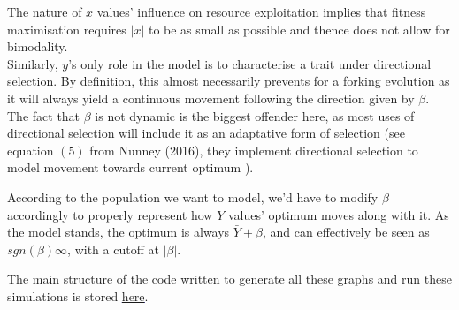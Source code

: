 \documentclass{article}
\begin{document}
The nature of $x$ values' influence on resource exploitation implies that fitness maximisation requires $\lvert x \rvert$ to be as small as possible and thence does not allow for bimodality. \\
\vspace{2mm}
Similarly, $y$'s only role in the model is to characterise a trait under directional selection. By definition, this almost necessarily prevents for a forking evolution as it will always yield a continuous movement following the direction given by $\beta$. \\
The fact that $\beta$ is not dynamic is the biggest offender here, as most uses of directional selection will include it as an adaptative form of selection (see equation $(5)$ from Nunney (2016), they implement directional selection to model movement towards current optimum \cite{Nun16}). \\
\vspace{5mm}

According to the population we want to model, we'd have to modify $\beta$ accordingly to properly represent how $Y$ values' optimum moves along with it. As the model stands, the optimum is always $\bar{Y}+\beta$, and can effectively be seen as $sgn(\beta) \infty$, with a cutoff  at $\lvert \beta \rvert$. \\
\vspace{1cm}

The main structure of the code written to generate all these graphs and run these simulations is stored \textcolor{blue}{\underline{\href{https://github.com/ChrisMzz/cmb-compbiol}{here}}}.





\end{document}
